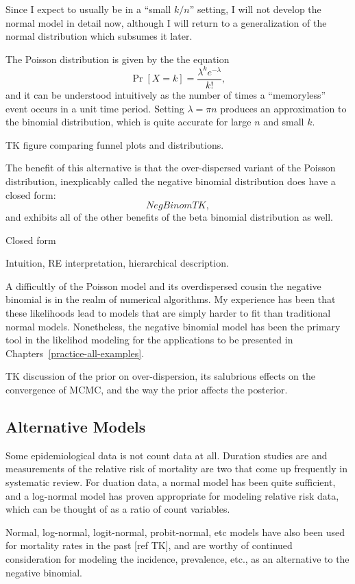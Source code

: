 Since I expect to usually be in a ``small $k/n$'' setting, I will not
develop the normal model in detail now, although I will return to a
generalization of the normal distribution which subsumes it later.

The Poisson distribution is given by the the equation
\[
\Pr[X=k] = \frac{\lambda^k e^{-\lambda}}{k!},
\]
and it can be understood intuitively as the number of times a
``memoryless'' event occurs in a unit time period.  Setting $\lambda =
\pi n$ produces an approximation to the binomial distribution, which
is quite accurate for large $n$ and small $k$.

TK figure comparing funnel plots and distributions.

The benefit of this alternative is that the over-dispersed variant of
the Poisson distribution, inexplicably called the negative binomial
distribution does have a closed form:
\[
Neg Binom TK,
\]
and exhibits all of the other benefits of the beta binomial
distribution as well.

Closed form

Intuition, RE interpretation, hierarchical description.

A difficultly of the Poisson model and its overdispersed cousin the
negative binomial is in the realm of numerical algorithms.  My
experience has been that these likelihoods lead to models that are
simply harder to fit than traditional normal models.  Nonetheless, the
negative binomial model has been the primary tool in the likelihod
modeling for the applications to be presented in
Chapters~\ref{practice-all-examples}.

TK discussion of the prior on over-dispersion, its salubrious effects
on the convergence of MCMC, and the way the prior affects the
posterior.

\subsection{Alternative Models}
Some epidemiological data is not count data at all.  Duration studies
are and measurements of the relative risk of mortality are two that
come up frequently in systematic review.  For duation data, a normal
model  has been quite sufficient, and a log-normal model has proven
appropriate for modeling relative risk data, which can be thought of
as a ratio of count variables.

Normal, log-normal, logit-normal, probit-normal, etc models have also
been used for mortality rates in the past [ref TK], and are worthy of
continued consideration for modeling the incidence, prevalence, etc.,
as an alternative to the negative binomial.

